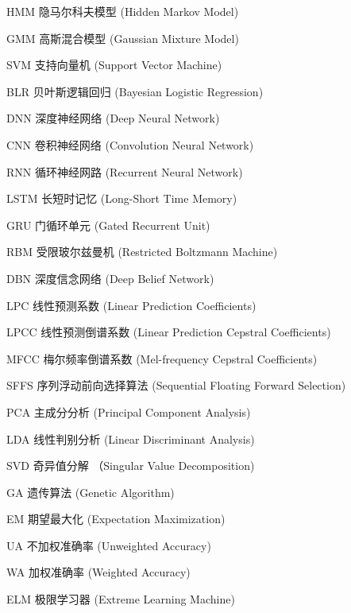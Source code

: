 \begin{denotation}[3cm]
\item [HMM] 隐马尔科夫模型 (Hidden Markov Model)
\item [GMM] 高斯混合模型  (Gaussian Mixture Model)
\item [SVM] 支持向量机 (Support Vector Machine)
\item [BLR] 贝叶斯逻辑回归 (Bayesian Logistic Regression)
\item [DNN] 深度神经网络 (Deep Neural Network)
\item [CNN] 卷积神经网络 (Convolution Neural Network)
\item [RNN] 循环神经网路 (Recurrent Neural Network)
\item [LSTM] 长短时记忆 (Long-Short Time Memory)
\item [GRU] 门循环单元 (Gated Recurrent Unit)
\item [RBM] 受限玻尔兹曼机 (Restricted Boltzmann Machine)
\item [DBN] 深度信念网络 (Deep Belief Network)
\item [LPC] 线性预测系数 (Linear Prediction Coefficients)
\item [LPCC] 线性预测倒谱系数 (Linear Prediction Cepstral Coefficients)
\item [MFCC] 梅尔频率倒谱系数 (Mel-frequency Cepstral Coefficients)
\item [SFFS] 序列浮动前向选择算法 (Sequential Floating Forward Selection)
\item [PCA] 主成分分析 (Principal Component Analysis)
\item [LDA] 线性判别分析 (Linear Discriminant Analysis)
\item [SVD] 奇异值分解 （Singular Value Decomposition)
\item [GA] 遗传算法 (Genetic Algorithm)
\item [EM] 期望最大化 (Expectation Maximization)
\item [UA] 不加权准确率 (Unweighted Accuracy)
\item [WA] 加权准确率 (Weighted Accuracy)
\item [ELM] 极限学习器 (Extreme Learning Machine)
\end{denotation}
